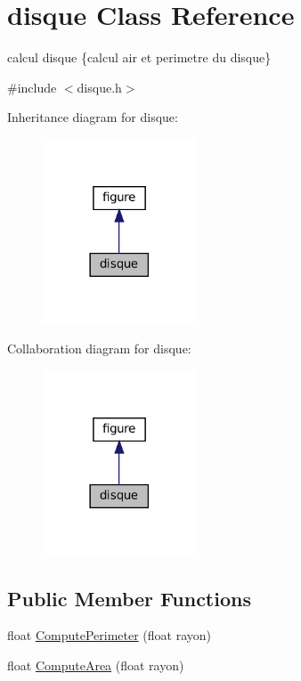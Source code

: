 \hypertarget{classdisque}{}\section{disque Class Reference}
\label{classdisque}


calcul disque \{calcul air et perimetre du disque\}  




{\ttfamily \#include $<$disque.\+h$>$}



Inheritance diagram for disque\+:
\nopagebreak
\begin{figure}[H]
\begin{center}
\leavevmode
\includegraphics[width=129pt]{classdisque__inherit__graph}
\end{center}
\end{figure}


Collaboration diagram for disque\+:
\nopagebreak
\begin{figure}[H]
\begin{center}
\leavevmode
\includegraphics[width=129pt]{classdisque__coll__graph}
\end{center}
\end{figure}
\subsection*{Public Member Functions}
\begin{DoxyCompactItemize}
\item 
float \hyperlink{classdisque_ac26d8f8f1b149a7214f347ae9655410a}{Compute\+Perimeter} (float rayon)
\item 
float \hyperlink{classdisque_a144bd3137c6cd183eba6792a4553764b}{Compute\+Area} (float rayon)
\end{DoxyCompactItemize}


